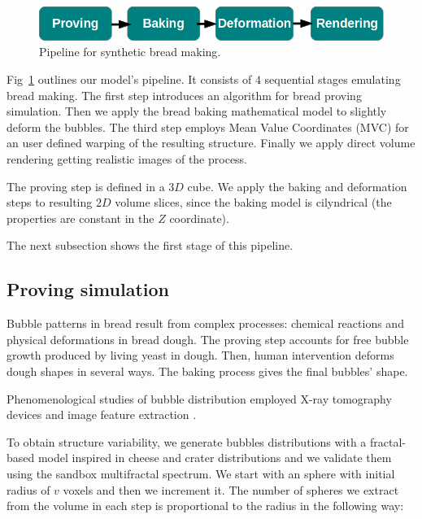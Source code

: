 \documentclass[final,5p,times]{elsarticle}
\begin{document}
{\begin{figure}
\includegraphics[scale=0.45]{pipeline.png}
\caption{Pipeline for synthetic bread making.}
\label{FigPipeline}
\end{figure}

Fig~\ref{FigPipeline} outlines our model's  pipeline. It consists of $4$ sequential stages emulating bread making. The first step introduces an algorithm for bread proving simulation. Then we apply the bread baking mathematical model \cite{Powathil2004} to slightly deform the bubbles. The third step employs Mean Value Coordinates (MVC) \cite{Floater2003} for an user defined warping of the resulting structure. Finally we apply direct volume rendering \cite{Kruger2003} getting realistic images of the process.

The proving step is defined in a $3D$ cube. We apply the baking and deformation steps to resulting $2D$ volume slices, since the baking model is cilyndrical (the properties are constant in the $Z$ coordinate).


The next subsection shows the first stage of this pipeline.

\subsection{Proving simulation}
\label{breadprov}
Bubble patterns in bread result from complex processes: chemical reactions and physical deformations in bread dough. The proving step accounts for free bubble growth produced by living yeast in dough. Then, human intervention deforms dough shapes in several ways. The baking process gives the final bubbles' shape.

Phenomenological studies of bubble distribution employed X-ray tomography devices and image feature extraction \cite{Babin2006,Gonzales2008,VanDyck2014}.

To obtain structure variability, we generate bubbles distributions with a fractal-based model inspired in cheese and crater distributions \cite{Mandelbrot1982} and we validate them using the sandbox multifractal spectrum.
 We start with an sphere with initial radius of $v$ voxels and then we increment it. The number of spheres we extract from the volume in each step is proportional to the radius in the following way:

}
\end{document}
